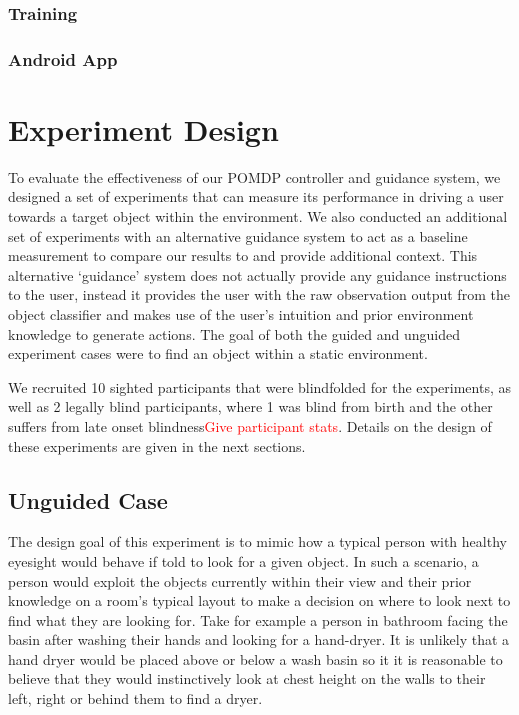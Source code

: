 \documentclass[runningheads]{llncs}
\newcommand\todo[1]{\textcolor{red}{#1}}
\begin{document}
\subsubsection{Training}

\subsubsection{Android App}

\section{Experiment Design}

To evaluate the effectiveness of our POMDP controller and guidance system, we designed a set of experiments that can measure its performance in driving a user towards a target object within the environment. 
We also conducted an additional set of experiments with an alternative guidance system to act as a baseline measurement to compare our results to and provide additional context. 
This alternative `guidance' system does not actually provide any guidance instructions to the user, instead it provides the user with the raw observation output from the object classifier and makes use of the user's intuition and prior environment knowledge to generate actions. 
The goal of both the guided and unguided experiment cases were to find an object within a static environment. 

We recruited 10 sighted participants that were blindfolded for the experiments, as well as 2 legally blind participants, where 1 was blind from birth and the other suffers from late onset blindness\todo{Give participant stats}.
Details on the design of these experiments are given in the next sections. 

\subsection{Unguided Case}

The design goal of this experiment is to mimic how a typical person with healthy eyesight would behave if told to look for a given object. 
In such a scenario, a person would exploit the objects currently within their view and their prior knowledge on a room's typical layout to make a decision on where to look next to find what they are looking for. 
Take for example a person in bathroom facing the basin after washing their hands and looking for a hand-dryer. 
It is unlikely that a hand dryer would be placed above or below a wash basin so it it is reasonable to believe that they would instinctively look at chest height on the walls to their left, right or behind them to find a dryer. 
\end{document}
